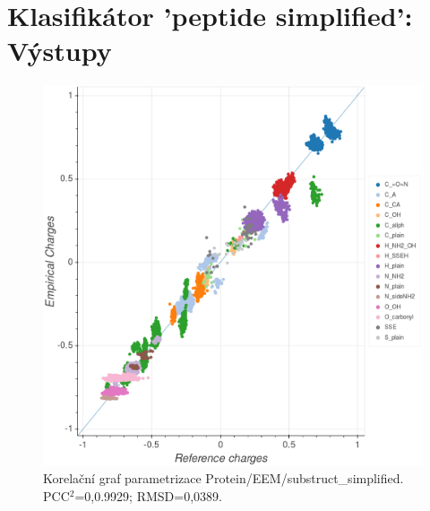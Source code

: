 \chapter{Klasifikátor 'peptide simplified': Výstupy}
\label{priloha_peptide}

\begin{figure}[h]
\begin{center}
\includegraphics[width=13cm]{pictures/graph_peptidesimpl_EEM.png}
\caption{Korelační graf parametrizace Protein/EEM/substruct\_simplified.  PCC$^2$=0,0.9929; RMSD=0,0389.}
\label{graph_peptidesimpl_EEM}
\end{center}
\end{figure}
\newpage

